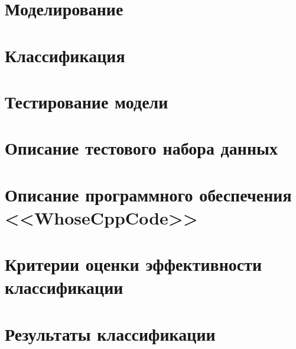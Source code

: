\newpage  
\section{Моделирование}\label{modeling}

 
 
\newpage  
\section{Классификация}\label{classifiers}


\newpage
\section{Тестирование модели}\label{testing}


\newpage 
\section{Описание тестового набора данных}\label{test_data}


\newpage
\section{Описание программного обеспечения <<WhoseCppCode>>}


\clearpage
\section{Критерии оценки эффективности классификации}\label{eval}

 
\newpage
\section{Результаты классификации}


% 
% 
% 
% 
% 
 
